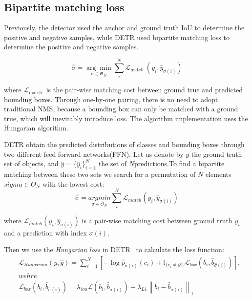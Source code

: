 \subsection{Bipartite matching loss}
\label{sec:matchingloss}
Previously, the detector used the anchor and ground truth IoU to determine the positive and negative samples,  while DETR used bipartite matching loss to determine the positive and negative samples. 

\begin{equation}
	\hat{\sigma}=\underset{\sigma \in \mathfrak{G}_{N}}{\arg \min } \sum_{i}^{N} \mathcal{L}_{\text {match }}\left(y_{i}, \hat{y}_{\sigma(i)}\right)
\end{equation}

where $ \mathcal{L}_{\text {match }} $ is the pair-wise matching cost between ground true and predicted bounding boxes. Through one-by-one pairing, there is no need to adopt traditional NMS, because a bounding box can only be matched with a ground true, which will inevitably introduce loss. The algorithm implementation uses the Hungarian algorithm.

DETR obtain the predicted distributions of classes and bounding boxes through two different feed forward networks(FFN). Let us denote by $ y $ the ground truth set of objects, and $  \hat{y}= \{ \hat{y}_i\} ^N_{i=1} $ the set of $ N  $predictions.To find a bipartite matching between these two sets we search for a permutation of $ N $ elements $sigma \in \Theta _N $ with the lowest cost:
\begin{equation}\label{equ:matcher}
	\hat{\sigma} = \underset{\sigma \in \Theta _N }{argmin} \sum_{i}^{N} \mathcal L_{match} (y_i,\hat{y}_{\sigma(i)})
\end{equation}

where $\mathcal L_{match} (y_i,\hat{y}_{\sigma(i)})$ is a pair-wise matching cost between ground truth $ y_i $ and a prediction with index $ \sigma(i) $.

Then we use the \textit{Hungarian loss }in DETR~\cite{carion2020end} to calculate the loss function:
\begin{equation}\label{equ:hungarianloss}
	\begin{aligned}
		&\mathcal L_{Hungarian}(y,\hat{y} ) = \sum^{N}_{i=1}[-\log{\hat{p}_{\hat{\sigma}(i)}(c_i)} + \mathbb{I}_{\{c_i \ne  \varnothing \}}\mathcal{L}_{box}(b_i,\hat{b}_{\hat{\sigma}(i)})   ], \\
		&wehre \\
		&\mathcal{L}_{box}(b_i,\hat{b}_{\hat{\sigma}(i)}) = \lambda_{iou}\mathcal{L}(b_i,\hat{b}_{\sigma(i)}) + \lambda_{L1}\left \| b_i - \hat{b}_{\sigma (i)}  \right \| _1
	\end{aligned}
\end{equation}

